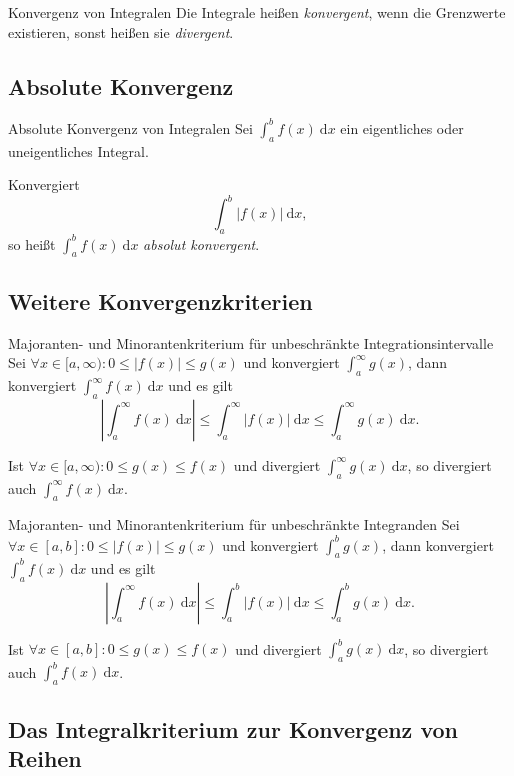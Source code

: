 \documentclass[german]{../spicker}
\renewcommand{\abs}[1]{\left| #1 \right|}
\newcommand{\dx}{~\mathrm{d}x}
\begin{document}
\begin{defi}{Konvergenz von Integralen}
    Die Integrale heißen \emph{konvergent}, wenn die Grenzwerte existieren, sonst heißen sie \emph{divergent}.
\end{defi}

\subsection{Absolute Konvergenz}

\begin{defi}{Absolute Konvergenz von Integralen}
    Sei $\int^b_a f(x) \dx$ ein eigentliches oder uneigentliches Integral.

    Konvergiert
    $$
        \int^b_a \abs{f(x)} \dx,
    $$
    so heißt $\int^b_a f(x) \dx$ \emph{absolut konvergent}.
\end{defi}

\subsection{Weitere Konvergenzkriterien}

\begin{defi}{Majoranten- und Minorantenkriterium für unbeschränkte Integrationsintervalle}
    Sei $\forall x \in [a, \infty) : 0 \leq \abs{f(x)} \leq g(x)$ und konvergiert $\int^\infty_a g(x)$, dann konvergiert $\int^\infty_a f(x) \dx$ und es gilt
    $$
        \abs{\int^\infty_a f(x) \dx} \leq \int^\infty_a \abs{f(x)} \dx \leq \int^\infty_a g(x) \dx.
    $$

    Ist $\forall x\in [a, \infty) : 0\leq g(x) \leq f(x)$ und divergiert $\int^\infty_a g(x) \dx$, so divergiert auch $\int^\infty_a f(x) \dx$.
\end{defi}

\begin{defi}{Majoranten- und Minorantenkriterium für unbeschränkte Integranden}
    Sei $\forall x \in [a, b] : 0 \leq \abs{f(x)} \leq g(x)$ und konvergiert $\int^b_a g(x)$, dann konvergiert $\int^b_a f(x) \dx$ und es gilt
    $$
        \abs{\int^\infty_a f(x) \dx} \leq \int^b_a \abs{f(x)} \dx \leq \int^b_a g(x) \dx.
    $$

    Ist $\forall x\in [a, b] : 0\leq g(x) \leq f(x)$ und divergiert $\int^b_a g(x) \dx$, so divergiert auch $\int^b_a f(x) \dx$.
\end{defi}

\subsection{Das Integralkriterium zur Konvergenz von Reihen}
\end{document}
